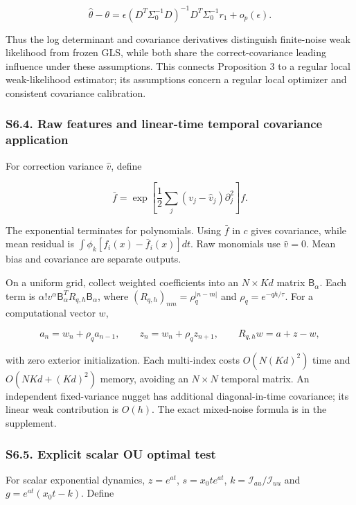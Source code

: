 \documentclass[
  american,
  11pt,
]{article}
\begin{document}
\[
\widehat\theta-\theta=\epsilon
(D^T\Sigma_0^{-1}D)^{-1}D^T\Sigma_0^{-1}r_1+o_p(\epsilon).
\]

Thus the log determinant and covariance derivatives distinguish
finite-noise weak likelihood from frozen GLS, while both share the
correct-covariance leading influence under these assumptions. This
connects Proposition 3 to a regular local weak-likelihood estimator; its
assumptions concern a regular local optimizer and consistent covariance
calibration.

\subsubsection{S6.4. Raw features and linear-time temporal covariance
application}\label{s6.4.-raw-features-and-linear-time-temporal-covariance-application}

For correction variance \(\widehat v\), define

\[
\bar f=\exp\left[\frac12\sum_j(v_j-\widehat v_j)\partial_j^2\right]f.
\]

The exponential terminates for polynomials. Using \(\bar f\) in \(c\)
gives covariance, while mean residual is
\(\int\phi_k[f_i(x)-\bar f_i(x)]dt\). Raw monomials use
\(\widehat v=0\). Mean bias and covariance are separate outputs.

On a uniform grid, collect weighted coefficients into an \(N\times Kd\)
matrix \(\mathsf B_\alpha\). Each term is
\(\alpha!v^\alpha \mathsf B_\alpha^TR_{q,h}\mathsf B_\alpha\), where
\((R_{q,h})_{nm}=\rho_q^{|n-m|}\) and \(\rho_q=e^{-qh/\tau}\). For a
computational vector \(w\),

\[
a_n=w_n+\rho_qa_{n-1},\qquad z_n=w_n+\rho_qz_{n+1},\qquad
R_{q,h}w=a+z-w,
\]

with zero exterior initialization. Each multi-index costs \(O(N(Kd)^2)\)
time and \(O(NKd+(Kd)^2)\) memory, avoiding an \(N\times N\) temporal
matrix. An independent fixed-variance nugget has additional
diagonal-in-time covariance; its linear weak contribution is \(O(h)\).
The exact mixed-noise formula is in the supplement.

\subsubsection{S6.5. Explicit scalar OU optimal
test}\label{s6.5.-explicit-scalar-ou-optimal-test}

For scalar exponential dynamics, \(z=e^{at}\), \(s=x_0te^{at}\),
\(k=\mathcal I_{au}/\mathcal I_{uu}\) and \(g=e^{at}(x_0t-k)\). Define
\end{document}
